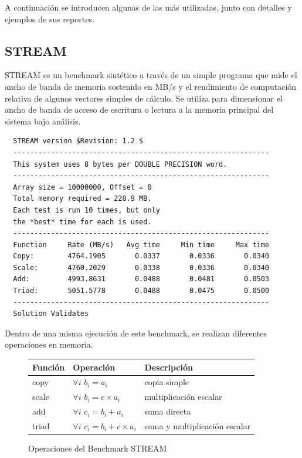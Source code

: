 \documentclass[a4paper]{report}
\begin{document}
\bigskip

A continuaci\'on se introducen algunas de las m\'as utilizadas, junto con
detalles y ejemplos de sus reportes.

\subsection{STREAM}

STREAM \cite{stream} es un benchmark sint\'etico a trav\'es de un simple
programa que mide el ancho de banda de memoria sostenido en MB/s y el
rendimiento de computaci\'on relativa de algunos vectores simples de c\'alculo.
Se utiliza para dimensionar el ancho de banda de acceso de escritura o lectura
a la memoria principal del sistema bajo an\'alisis.

\begin{verbatim}
  STREAM version $Revision: 1.2 $
  -------------------------------------------------------------
  This system uses 8 bytes per DOUBLE PRECISION word.
  -------------------------------------------------------------
  Array size = 10000000, Offset = 0
  Total memory required = 228.9 MB.
  Each test is run 10 times, but only
  the *best* time for each is used.
  -------------------------------------------------------------
  Function     Rate (MB/s)   Avg time     Min time     Max time
  Copy:        4764.1905       0.0337       0.0336       0.0340
  Scale:       4760.2029       0.0338       0.0336       0.0340
  Add:         4993.8631       0.0488       0.0481       0.0503
  Triad:       5051.5778       0.0488       0.0475       0.0500
  -------------------------------------------------------------
  Solution Validates
\end{verbatim}

Dentro de una misma ejecuci\'on de este benchmark, se realizan diferentes
operaciones en memoria.

\begin{figure}[H]
  \begin{center}
    \begin{tabular}{|l|l|l|}\hline
      {\bf Funci\'on} & {\bf Operaci\'on} & {\bf Descripci\'on} \\ \hline
      copy & $ \forall i $ $ b_{i} = a_{i} $ & copia simple \\ \hline
      scale & $ \forall i $ $ b_{i} = c \times a_{i} $ & multiplicaci\'on escalar \\ \hline
      add & $ \forall i $ $ c_{i} = b_{i} + a_{i} $ & suma directa \\ \hline
      triad & $ \forall i $ $ c_{i} = b_{i} + c \times a_{i} $ & suma y multiplicaci\'on escalar \\ \hline
    \end{tabular}
    \caption{Operaciones del Benchmark STREAM}
  \end{center}
  \label{stream}
\end{figure}
\end{document}
